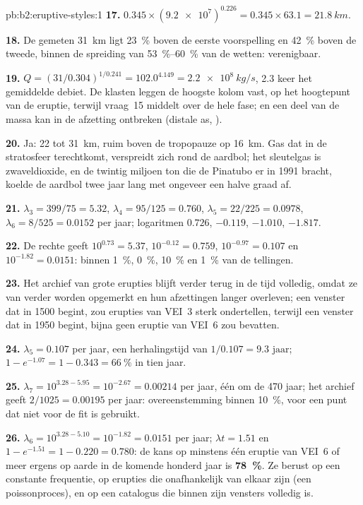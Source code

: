 \begin{solution}{pb:b2:eruptive-styles:1}
\textbf{17.} $0.345\times(\num{9.2e7})^{0.226} = 0.345\times63.1 = \qty{21.8}{km}$.

\textbf{18.} De gemeten \qty{31}{km} ligt \qty{23}{\percent} boven de eerste
voorspelling en \qty{42}{\percent} boven de tweede, binnen de
spreiding van \qtyrange{53}{60}{\percent} van de wetten: verenigbaar.

\textbf{19.} $Q = (31/0.304)^{1/0.241} = 102.0^{4.149} = \qty{2.2e8}{kg/s}$, 2.3 keer
het gemiddelde debiet. De klasten leggen de hoogste kolom vast, op het hoogtepunt van de
eruptie, terwijl vraag~15 middelt over de hele fase; en een deel van de massa
kan in de afzetting ontbreken (distale as, ).

\textbf{20.} Ja: 22 tot \qty{31}{km}, ruim boven de tropopauze op \qty{16}{km}.
Gas dat in de stratosfeer terechtkomt, verspreidt zich rond de aardbol; het sleutelgas is
zwaveldioxide, en de twintig miljoen ton die de Pinatubo er in 1991 bracht,
koelde de aardbol twee jaar lang met ongeveer een halve graad af.

\textbf{21.} $\lambda_3 = 399/75 = 5.32$, $\lambda_4 = 95/125 = 0.760$, $\lambda_5 = 22/225 =
0.0978$, $\lambda_6 = 8/525 = 0.0152$ per jaar; logaritmen $0.726$, $-0.119$, $-1.010$,
$-1.817$.

\textbf{22.} De rechte geeft $10^{0.73} = 5.37$, $10^{-0.12} = 0.759$, $10^{-0.97} =
0.107$ en $10^{-1.82} = 0.0151$: binnen \qty{1}{\percent}, \qty{0}{\percent},
\qty{10}{\percent} en \qty{1}{\percent} van de tellingen.

\textbf{23.} Het archief van grote erupties blijft verder terug in de tijd volledig,
omdat ze van verder worden opgemerkt en hun afzettingen langer overleven; een
venster dat in 1500 begint, zou erupties van VEI~3 sterk ondertellen, terwijl een venster
dat in 1950 begint, bijna geen eruptie van VEI~6 zou bevatten.

\textbf{24.} $\lambda_5 = \num{0.107}$ per jaar, een herhalingstijd van $1/0.107 =
\num{9.3}\text{ jaar}$; $1 - e^{-1.07} = 1 - 0.343 = \qty{66}{\percent}$ in tien jaar.

\textbf{25.} $\lambda_7 = 10^{3.28 - 5.95} = 10^{-2.67} = 0.00214$ per jaar, één om de
470 jaar; het archief geeft $2/1025 = 0.00195$ per jaar: overeenstemming binnen
\qty{10}{\percent}, voor een punt dat niet voor de fit is gebruikt.

\textbf{26.} $\lambda_6 = 10^{3.28 - 5.10} = 10^{-1.82} = 0.0151$ per jaar; $\lambda t = 1.51$
en $1 - e^{-1.51} = 1 - 0.220 = 0.780$: de kans op minstens één eruptie
van VEI~6 of meer ergens op aarde in de komende honderd jaar is
\textbf{\qty[text-series-to-math=true]{78}{\percent}}. Ze berust op een constante frequentie,
op erupties die onafhankelijk van elkaar zijn (een poissonproces), en op een
catalogus die binnen zijn vensters volledig is.
\end{solution}
